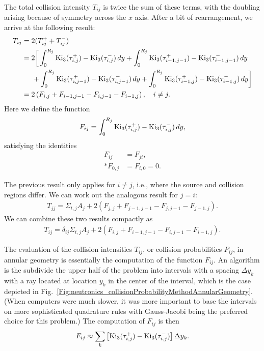 The total collision intensity $T_{ij}$ is twice the sum of these terms, with the doubling arising because of symmetry across the $x$ axis. After a bit of rearrangement, we arrive at the following result:
\begin{align}
  T_{ij} 
  &= 2 ( T_{ij}^+ + T_{ij}^- ) \nonumber \\
  &= 2 \bigg[ \int_0^{R_j} \textrm{Ki}_3( \tau_{i,j}^+) - \textrm{Ki}_3( \tau_{i,j}^-) \, dy + \int_0^{R_j}  \textrm{Ki}_3( \tau_{i-1,j-1}^+) - \textrm{Ki}_3( \tau_{i-1,j-1}^-) \, dy \nonumber \\
  &\hspace{0.5cm} + \int_0^{R_j} \textrm{Ki}_3( \tau_{i,j-1}^+) - \textrm{Ki}_3( \tau_{i,j-1}^-) \, dy + \int_0^{R_j} \textrm{Ki}_3( \tau_{i-1,j}^+) - \textrm{Ki}_3( \tau_{i-1,j}^-) \, dy \bigg] \nonumber \\
  &= 2 \left( F_{i,j} + F_{i-1,j-1} - F_{i,j-1} - F_{i-1,j} \right) , \quad i \ne j.
\end{align}
Here we define the function
\begin{align}
  F_{ij} = \int_0^{R_j} \textrm{Ki}_3( \tau_{i,j}^+) - \textrm{Ki}_3( \tau_{i,j}^-) \, dy,
\end{align}
satisfying the identities
\begin{subequations}
\begin{align}
  F_{ij}  &= F_{ji}, \\*
  F_{0,j} &= F_{i,0} = 0.
\end{align}
\end{subequations}

The previous result only applies for $i \ne j$, i.e., where the source and collision regions differ. We can work out the analogous result for $j = i$:
\begin{align}
  T_{jj} = \Sigma_{t,j} A_j + 2  \left( F_{j,j} + F_{j-1,j-1} - F_{j,j-1} - F_{j-1,j} \right) .
\end{align}
We can combine these two results compactly as
\begin{align}
  T_{ij} = \delta_{ij}  \Sigma_{t,j} A_j + 2 \left( F_{i,j} + F_{i-1,j-1} - F_{i,j-1} - F_{i-1,j} \right) .
\end{align}

The evaluation of the collision intensities $T_{ij}$, or collision probabilities $P_{ij}$, in annular geometry is essentially the computation of the function $F_{ij}$. An algorithm is the subdivide the upper half of the problem into intervals with a spacing $\Delta y_k$ with a ray located at location $y_k$ in the center of the interval, which is the case depicted in Fig.~\ref{Fig:neutronics_collisionProbabilityMethodAnnularGeometry}. (When computers were much slower, it was more important to base the intervals on more sophisticated quadrature rules with Gauss-Jacobi being the preferred choice for this problem.) The computation of $F_{ij}$ is then
\begin{align}
  F_{ij} \approx \sum_k \left[ \textrm{Ki}_3( \tau_{i,j}^+) - \textrm{Ki}_3( \tau_{i,j}^-) \right] \Delta y_k .
\end{align}


